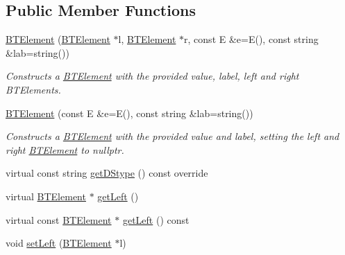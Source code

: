 \subsection*{Public Member Functions}
\begin{DoxyCompactItemize}
\item 
\mbox{\hyperlink{classbridges_1_1datastructure_1_1_b_t_element_a7d93a35b1f2553cfd92a289a363caa5a}{B\+T\+Element}} (\mbox{\hyperlink{classbridges_1_1datastructure_1_1_b_t_element}{B\+T\+Element}} $\ast$l, \mbox{\hyperlink{classbridges_1_1datastructure_1_1_b_t_element}{B\+T\+Element}} $\ast$r, const E \&e=E(), const string \&lab=string())
\begin{DoxyCompactList}\small\item\em Constructs a \mbox{\hyperlink{classbridges_1_1datastructure_1_1_b_t_element}{B\+T\+Element}} with the provided value, label, left and right B\+T\+Elements. \end{DoxyCompactList}\item 
\mbox{\hyperlink{classbridges_1_1datastructure_1_1_b_t_element_a1bea31e483a1bf737e5da5cc9178bc3d}{B\+T\+Element}} (const E \&e=E(), const string \&lab=string())
\begin{DoxyCompactList}\small\item\em Constructs a \mbox{\hyperlink{classbridges_1_1datastructure_1_1_b_t_element}{B\+T\+Element}} with the provided value and label, setting the left and right \mbox{\hyperlink{classbridges_1_1datastructure_1_1_b_t_element}{B\+T\+Element}} to nullptr. \end{DoxyCompactList}\item 
virtual const string \mbox{\hyperlink{classbridges_1_1datastructure_1_1_b_t_element_a2118b6b74f3fe0fec39e3b258a7dee89}{get\+D\+Stype}} () const override
\item 
virtual \mbox{\hyperlink{classbridges_1_1datastructure_1_1_b_t_element}{B\+T\+Element}} $\ast$ \mbox{\hyperlink{classbridges_1_1datastructure_1_1_b_t_element_aaa551a4f24bb7ed63fd39e9c4153402b}{get\+Left}} ()
\item 
virtual const \mbox{\hyperlink{classbridges_1_1datastructure_1_1_b_t_element}{B\+T\+Element}} $\ast$ \mbox{\hyperlink{classbridges_1_1datastructure_1_1_b_t_element_aa13df422de48c6297223c3c28caf9277}{get\+Left}} () const
\item 
void \mbox{\hyperlink{classbridges_1_1datastructure_1_1_b_t_element_a6baeb1237f1879eb6a04fc144a7b55d6}{set\+Left}} (\mbox{\hyperlink{classbridges_1_1datastructure_1_1_b_t_element}{B\+T\+Element}} $\ast$l)
\item 

\end{DoxyCompactItemize}
